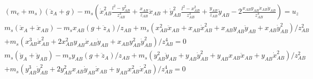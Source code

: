 \documentclass{article}
\begin{document}
\begin{multline}
	(m_e + m_s)(\ddot{z}_A+g) - m_s\left(\dot{x}_{AB}^2\frac{l^2 - y_{AB}^2}{z_{AB}^3} + \frac{x_{AB}}{z_{AB}}\ddot{x}_{AB} + \dot{y}_{AB}^2\frac{l^2-x_{AB}^2}{z_{AB}^3} + \frac{y_{AB}}{z_{AB}}\ddot{y}_{AB} - 2 \frac{x_{AB}y_{AB}\dot{x}_{AB}\dot{y}_{AB}}{z_{AB}^3}\right) = u_z
\end{multline}
\begin{multline}
	m_s(\ddot{x}_A + \ddot{x}_{AB}) - m_sx_{AB}(g+\ddot{z}_A)/z_{AB} + m_s(x_{AB}^2\ddot{x}_{AB}+x_{AB}\dot{x}_{AB}^2+x_{AB}y_{AB}\ddot{y}_{AB}+x_{AB}\dot{y}_{AB}^2)/z_{AB}^2\\
	+ m_s(x_{AB}^3\dot{x}_{AB}^2 + 2x_{AB}^2y_{AB}\dot{x}_{AB}\dot{y}_{AB} + x_{AB}y_{AB}^2\dot{y}_{AB}^2)/z_{AB}^4=0
\end{multline}
\begin{multline}
	m_s(\ddot{y}_A + \ddot{y}_{AB}) - m_sy_{AB}(g+\ddot{z}_A)/z_{AB} + m_s(y_{AB}^2\ddot{y}_{AB}+y_{AB}\dot{y}_{AB}^2+y_{AB}x_{AB}\ddot{x}_{AB}+y_{AB}\dot{x}_{AB}^2)/z_{AB}^2\\
	+ m_s(y_{AB}^3\dot{y}_{AB}^2 + 2y_{AB}^2x_{AB}\dot{y}_{AB}\dot{x}_{AB} + y_{AB}x_{AB}^2\dot{x}_{AB}^2)/z_{AB}^4=0
\end{multline}
\end{document}
